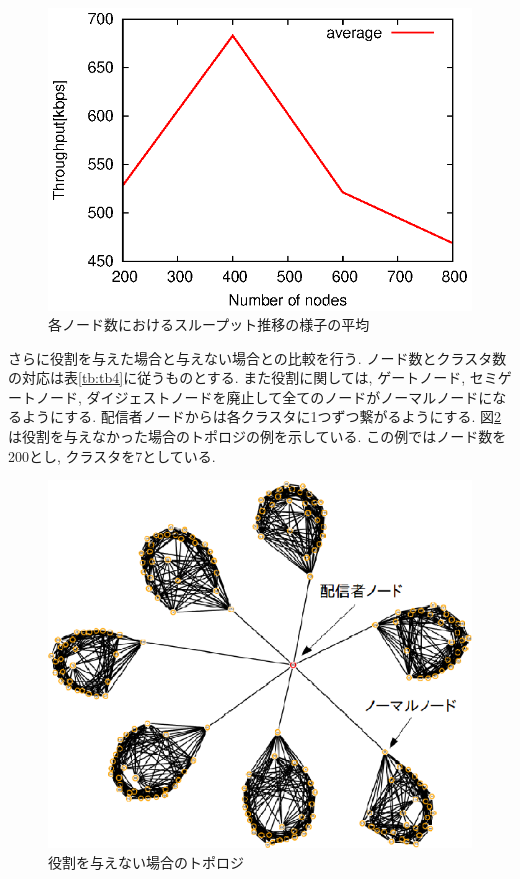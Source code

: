 \documentclass[letter]{ieicej}
\begin{document}
\begin{figure}[h]
  \begin{center}
    \includegraphics{fig10.eps}
  \end{center}
  \caption{各ノード数におけるスループット推移の様子の平均}
  \label{fig:fig10}
\end{figure}

さらに役割を与えた場合と与えない場合との比較を行う. ノード数とクラスタ数の対応は表\ref{tb:tb4}に従うものとする. また役割に関しては, ゲートノード, セミゲートノード, ダイジェストノードを廃止して全てのノードがノーマルノードになるようにする. 配信者ノードからは各クラスタに1つずつ繋がるようにする. 図\ref{fig:fig11}は役割を与えなかった場合のトポロジの例を示している. この例ではノード数を200とし, クラスタを7としている.

\begin{figure}[h]
  \begin{center}
    \includegraphics{topology2.eps}
  \end{center}
  \caption{役割を与えない場合のトポロジ}
  \label{fig:fig11}
\end{figure}
\end{document}
